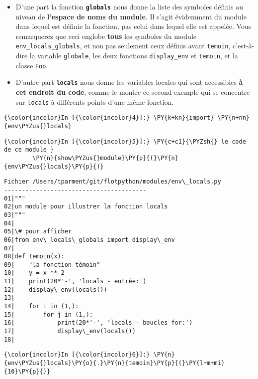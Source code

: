 \begin{itemize}
\item
  D'une part la fonction \textbf{\texttt{globals}} nous donne la liste
  des symboles définis au niveau de \textbf{l'espace de noms du module}.
  Il s'agit évidemment du module dans lequel est définie la fonction,
  pas celui dans lequel elle est appelée. Vous remarquerez que ceci
  englobe \textbf{tous} les symboles du module
  \texttt{env\_locals\_globals}, et non pas seulement ceux définis avant
  \texttt{temoin}, c'est-à-dire la variable \texttt{globale}, les deux
  fonctions \texttt{display\_env} et \texttt{temoin}, et la classe
  \texttt{Foo}.
\item
  D'autre part \textbf{\texttt{locals}} nous donne les variables locales
  qui sont accessibles \textbf{à cet endroit du code}, comme le montre
  ce second exemple qui se concentre sur \texttt{locals} à différents
  points d'une même fonction.
\end{itemize}

    \begin{Verbatim}[commandchars=\\\{\}]
{\color{incolor}In [{\color{incolor}4}]:} \PY{k+kn}{import} \PY{n+nn}{env\PYZus{}locals}
\end{Verbatim}


    \begin{Verbatim}[commandchars=\\\{\}]
{\color{incolor}In [{\color{incolor}5}]:} \PY{c+c1}{\PYZsh{} le code de ce module }
        \PY{n}{show\PYZus{}module}\PY{p}{(}\PY{n}{env\PYZus{}locals}\PY{p}{)}
\end{Verbatim}


    \begin{Verbatim}[commandchars=\\\{\}]
Fichier /Users/tparment/git/flotpython/modules/env\_locals.py
----------------------------------------
01|"""
02|un module pour illustrer la fonction locals
03|"""
04|
05|\# pour afficher
06|from env\_locals\_globals import display\_env
07|
08|def temoin(x):
09|    "la fonction témoin"
10|    y = x ** 2
11|    print(20*'-', 'locals - entrée:')
12|    display\_env(locals())
13|
14|    for i in (1,):
15|        for j in (1,):
16|            print(20*'-', 'locals - boucles for:')
17|            display\_env(locals())
18|            

    \end{Verbatim}

    \begin{Verbatim}[commandchars=\\\{\}]
{\color{incolor}In [{\color{incolor}6}]:} \PY{n}{env\PYZus{}locals}\PY{o}{.}\PY{n}{temoin}\PY{p}{(}\PY{l+m+mi}{10}\PY{p}{)}
\end{Verbatim}


